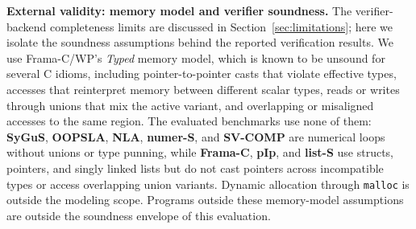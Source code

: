 \DIFaddbegin
\smallskip
\noindent\textbf{External validity: memory model and verifier soundness.}
The verifier-backend completeness limits are discussed in
Section~\ref{sec:limitations}; here we isolate the soundness assumptions behind
the reported verification results. We use Frama-C/WP's \emph{Typed} memory model,
which is known to be unsound for several C idioms, including pointer-to-pointer
casts that violate effective types, accesses that reinterpret memory between
different scalar types, reads or writes through unions that mix the active
variant, and overlapping or misaligned accesses to the same region. The evaluated
benchmarks use none of them: \textbf{SyGuS}, \textbf{OOPSLA}, \textbf{NLA},
\textbf{numer-S}, and \textbf{SV-COMP} are numerical loops without unions or type
punning, while \textbf{Frama-C}, \textbf{pIp}, and \textbf{list-S} use structs,
pointers, and singly linked lists but do not cast pointers across incompatible
types or access overlapping union variants. Dynamic allocation through
\texttt{malloc} is outside the modeling scope. Programs outside these memory-model
assumptions are outside the soundness envelope of this evaluation.
\DIFaddend
